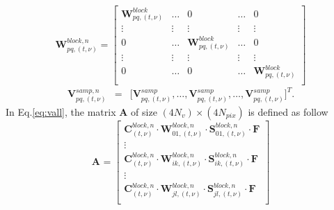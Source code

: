 \documentclass[useAMS,usenatbib]{mn2e}
\begin{document}
\begin{equation*}
\mathbf{W}_{pq,(t,\nu)}^{block,n}=
  \begin{bmatrix}
    \mathbf{W}_{pq,(t,\nu)}^{block} &\dots & 0 & \dots & 0\\
    \vdots & \vdots & \vdots & \vdots & \vdots\\
    0 & \dots& \mathbf{W}_{pq,(t,\nu)}^{block} &\dots & 0\\
    \vdots & \vdots & \vdots & \vdots & \vdots \\
    0 & \dots& 0 &\dots & \mathbf{W}_{pq,(t,\nu)}^{block}\\
  \end{bmatrix}
\end{equation*}
\begin{eqnarray*}
\mathbf{V}_{pq,(t,\nu)}^{samp,n}&=&\Bigg[\mathbf{V}_{pq,(t,\nu)}^{samp},\dots, \mathbf{V}_{pq,(t,\nu)}^{samp}, \dots,
\mathbf{V}_{pq,(t,\nu)}^{samp}\Bigg]^T. 
\end{eqnarray*}
In Eq.\ref{eq:vall}, the matrix $\mathbf{A}$ of size $(4N_v)\times (4N_{pix})$ is defined as follow
\begin{equation*}
\mathbf{A}_{}=
  \begin{bmatrix}
    \mathbf{C}_{(t,\nu)}^{block,n}\cdot \mathbf{W}_{01,(t,\nu)}^{block,n}\cdot \mathbf{S}_{01,(t,\nu)}^{block,n} \cdot\mathbf{F}\\
    \vdots\\
    \mathbf{C}_{(t,\nu)}^{block,n}\cdot \mathbf{W}_{ik,(t,\nu)}^{block,n}\cdot \mathbf{S}_{ik,(t,\nu)}^{block,n} \cdot\mathbf{F}\\
    \vdots \\
    \mathbf{C}_{(t,\nu)}^{block,n}\cdot \mathbf{W}_{jl,(t,\nu)}^{block,n}\cdot \mathbf{S}_{jl,(t,\nu)}^{block,n} \cdot\mathbf{F}\\
  \end{bmatrix}
\end{equation*}
\end{document}
